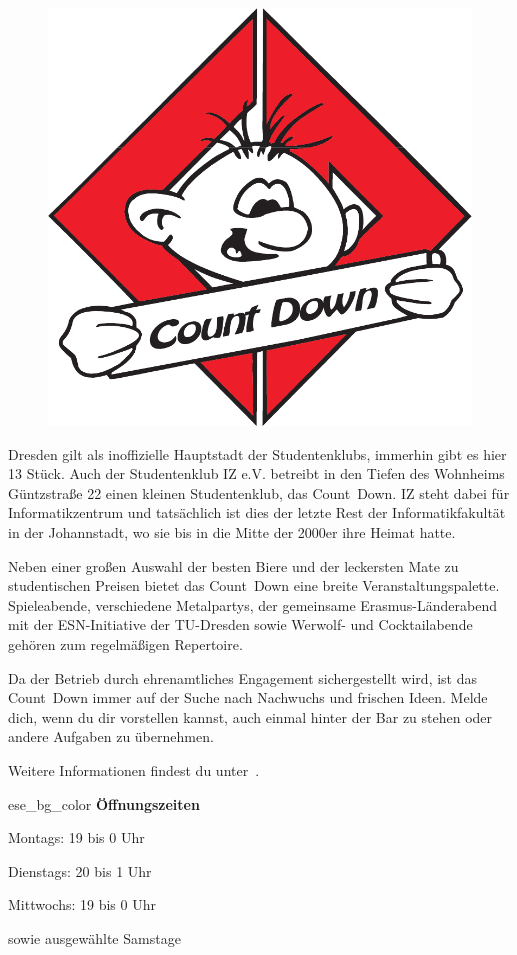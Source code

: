 \begin{figure}%
  \vspace{-.5cm}
  \includegraphics[width=\linewidth]{img/countdown}
  \vspace{-1cm}
\end{figure}

Dresden gilt als inoffizielle Hauptstadt der Studentenklubs, immerhin gibt es hier 13 Stück.
Auch der Studentenklub IZ e.V. betreibt in den Tiefen des Wohnheims Güntzstraße 22 einen kleinen Studentenklub, das Count~Down.
IZ steht dabei für Informatikzentrum und tatsächlich ist dies der letzte Rest der Informatikfakultät in der Johannstadt, wo sie bis in die Mitte der 2000er ihre Heimat hatte.

Neben einer großen Auswahl der besten Biere und der leckersten Mate zu studentischen Preisen bietet das Count~Down eine breite Veranstaltungspalette. Spieleabende, verschiedene Metalpartys, der gemeinsame Erasmus-Länderabend mit der ESN-Initiative der TU-Dresden sowie Werwolf- und Cocktailabende gehören zum regelmäßigen Repertoire.

Da der Betrieb durch ehrenamtliches Engagement sichergestellt wird, ist das Count~Down immer auf der Suche nach Nachwuchs und frischen Ideen. Melde dich, wenn du dir vorstellen kannst, auch einmal hinter der Bar zu stehen oder andere Aufgaben zu übernehmen.

Weitere Informationen findest du unter~.

\begin{awesomeblock}{2pt}{\faCalendar*[regular]}{ese_bg_color}
    \textbf{Öffnungszeiten}

    Montags: 19 bis 0 Uhr

    Dienstags: 20 bis 1 Uhr

    Mittwochs: 19 bis 0 Uhr

    sowie ausgewählte Samstage
\end{awesomeblock}
